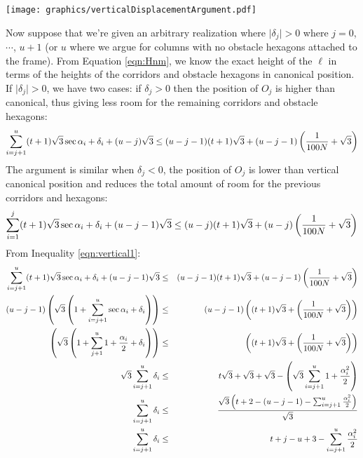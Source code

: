 \begin{minipage}{\linewidth}
\begin{center}
\texttt{[image: graphics/verticalDisplacementArgument.pdf]}
\label{fig:verticalDisplacementArgument.pdf}
\end{center}
\end{minipage}

Now suppose that we're given an arbitrary realization where $\vert \delta_j \vert > 0$ where $j = 0$, $\cdots$, $u+1$ (or $u$ where we argue for columns with no obstacle hexagons attached to the frame).
From Equation \ref{eqn:Hnm}, we know the exact height of the $\ell$ in terms of the heights of the corridors and obstacle hexagons in canonical position.
If $\vert \delta_j \vert > 0$, we have two cases: if $\delta_j > 0$ then the position of $O_j$ is higher than canonical, thus giving less room for the remaining corridors and obstacle hexagons:
\begin{equation}\label{eqn:vertical1}
\sum_{i=j+1}^u (t+1) \sqrt{3} \sec \alpha_i + \delta_i + (u - j) \sqrt{3} \leq (u-j-1) (t+1) \sqrt{3} + (u-j-1) \left( \frac{1}{100N} + \sqrt{3} \right)
\end{equation}
The argument is similar when $\delta_j < 0$, the position of $O_j$ is lower than vertical canonical position and reduces the total amount of room for the previous corridors and hexagons:
\begin{equation}\label{eqn:vertical2}
\sum_{i=1}^{j} (t+1) \sqrt{3} \sec \alpha_i + \delta_i + (u - j-1) \sqrt{3}  \leq (u-j) (t+1) \sqrt{3} + (u-j) \left( \frac{1}{100N} + \sqrt{3} \right)
\end{equation}
From Inequality \ref{eqn:vertical1}:
\begin{eqnarray*}
\sum_{i=j+1}^u (t+1) \sqrt{3} \sec \alpha_i + \delta_i + (u - j-1) \sqrt{3} &\leq& (u-j-1) (t+1) \sqrt{3} + (u-j-1) \left( \frac{1}{100N} + \sqrt{3} \right)\\
(u-j-1) \left( \sqrt{3} \left( 1 + \sum_{i=j+1}^{u} \sec \alpha_i + \delta_i \right) \right) &\leq& (u-j-1) \left(  (t+1) \sqrt{3} + \left( \frac{1}{100N} + \sqrt{3} \right)  \right)\\
\left( \sqrt{3} \left( 1 + \sum_{j+1}^{u} 1 + \frac{\alpha_i}{2} + \delta_i \right) \right) &\leq& \left(  (t+1) \sqrt{3} + \left( \frac{1}{100N} + \sqrt{3} \right)  \right)\\
\sqrt{3}\sum_{i=j+1}^{u}   \delta_i & \leq&  t\sqrt{3} + \sqrt{3}+ \sqrt{3} - \left( \sqrt{3}\sum_{i=j+1}^{u} 1 + \frac{\alpha_i^2}{2} \right) \\
\sum_{i=j+1}^{u}   \delta_i &\leq& \frac{\sqrt{3} \left( t+2 - \left( u-j-1 \right) - \sum_{i=j+1}^{u}\frac{\alpha_i^2}{2} \right)}{\sqrt{3}}\\
\sum_{i=j+1}^{u}   \delta_i &\leq& t+j-u+3 - \sum_{i=j+1}^{u}\frac{\alpha_i^2}{2}
\end{eqnarray*}